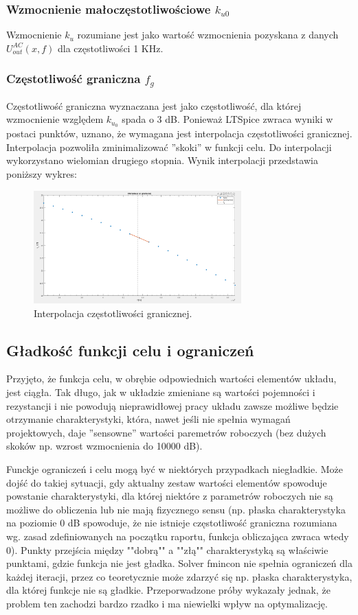 \documentclass{article}
\begin{document}
\subsubsection*{Wzmocnienie małoczęstotliwościowe $k_{u0}$}
Wzmocnienie $k_u$ rozumiane jest jako wartość wzmocnienia pozyskana z danych $U^{AC}_{out}(x,f)$ dla częstotliwości 1 KHz.

\subsubsection*{Częstotliwość graniczna $f_g$}
Częstotliwość graniczna wyznaczana jest jako częstotliwość, dla której wzmocnienie względem $k_{u{_0}}$ spada o 3 dB.
Ponieważ LTSpice zwraca wyniki w postaci punktów, uznano, że wymagana jest interpolacja częstotliwości granicznej. Interpolacja pozwoliła zminimalizować ''skoki'' w funkcji celu. Do interpolacji wykorzystano wielomian drugiego stopnia. Wynik interpolacji przedstawia poniższy wykres:
\begin{figure}[h]
	\includegraphics[width=8cm]{graphics/fg_interp.png}
	\centering
	\caption{Interpolacja częstotliwości granicznej.}
\end{figure}




\subsection{Gładkość funkcji celu i ograniczeń}
Przyjęto, że funkcja celu, w obrębie odpowiednich wartości elementów układu, jest ciągła. Tak długo, jak w układzie zmieniane są wartości pojemności i rezystancji i
nie powodują nieprawidłowej pracy układu zawsze możliwe będzie otrzymanie charakterystyki, która, nawet jeśli nie spełnia wymagań projektowych, daje ''sensowne'' wartości paremetrów roboczych (bez dużych skoków
np. wzrost wzmocnienia do 10000 dB).

Funckje ograniczeń i celu mogą być w niektórych przypadkach niegładkie. Może dojść do takiej sytuacji, gdy aktualny zestaw wartości elementów spowoduje powstanie charakterystyki,
dla której niektóre z parametrów roboczych nie są możliwe do obliczenia lub nie mają fizycznego sensu (np. płaska charakterystyka na poziomie 0 dB spowoduje, że nie istnieje częstotliwość graniczna rozumiana wg. zasad zdefiniowanych
na początku raportu, funkcja obliczająca zwraca wtedy 0). Punkty przejścia między ""dobrą"" a ""złą"" charakterystyką są właściwie punktami, gdzie funkcja nie jest gładka. Solver fmincon nie spełnia ograniczeń dla każdej iteracji, przez co teoretycznie może zdarzyć się np. płaska charakterystyka, 
dla której funkcje nie są gładkie. Przeporwadzone próby wykazały jednak, że problem ten zachodzi bardzo rzadko i ma niewielki wpływ na optymalizację.
\end{document}
